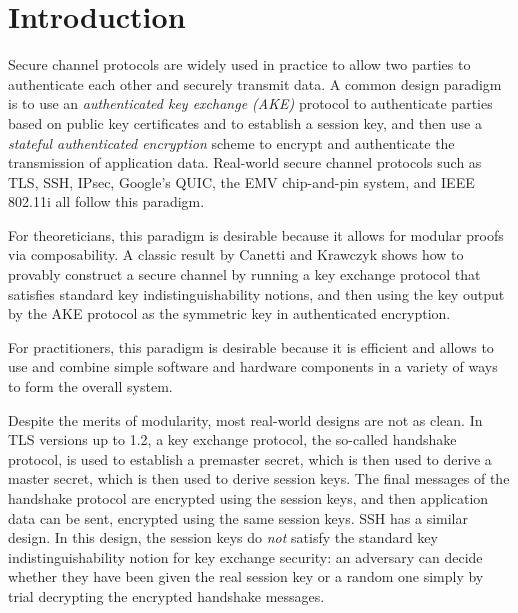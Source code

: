\section{Introduction}\label{sec:introduction}


Secure channel protocols are widely used in practice to allow two parties to authenticate each other and securely transmit data.  
A common design paradigm is to use an \emph{authenticated key exchange (AKE)} protocol to authenticate parties based on public key certificates and to establish a session key, and then use a \emph{stateful authenticated encryption} scheme to encrypt and authenticate the transmission of application data.  
Real-world secure channel protocols such as TLS, SSH, IPsec, Google's QUIC, the EMV chip-and-pin system, and IEEE 802.11i all follow this paradigm.  

For theoreticians, this paradigm is desirable because it allows for modular proofs via composability.  
A classic result by Canetti and Krawczyk \cite{EC:CanKra01} shows how to provably construct a secure channel by running a key exchange protocol that satisfies standard key indistinguishability notions, and then using the key output by the AKE protocol as the symmetric key in authenticated encryption.  

For practitioners, this paradigm is desirable because it is efficient and allows to use and combine simple software and hardware components in a variety of ways to form the overall system.

Despite the merits of modularity, most real-world designs are not as clean.  
In TLS versions up to 1.2, a key exchange protocol, the so-called handshake protocol, 
is used to establish a premaster secret, 
which is then used to derive a master secret, 
which is then used to derive session keys.  
The final messages of the handshake protocol are encrypted using the session keys, and then application data can be sent, encrypted using the same session keys.  
SSH has a similar design.  
In this design, the session keys do \emph{not} satisfy the standard key indistinguishability notion for key exchange security: 
an adversary can decide whether they have been given the real session key or a random one simply by trial decrypting the encrypted handshake messages.  

